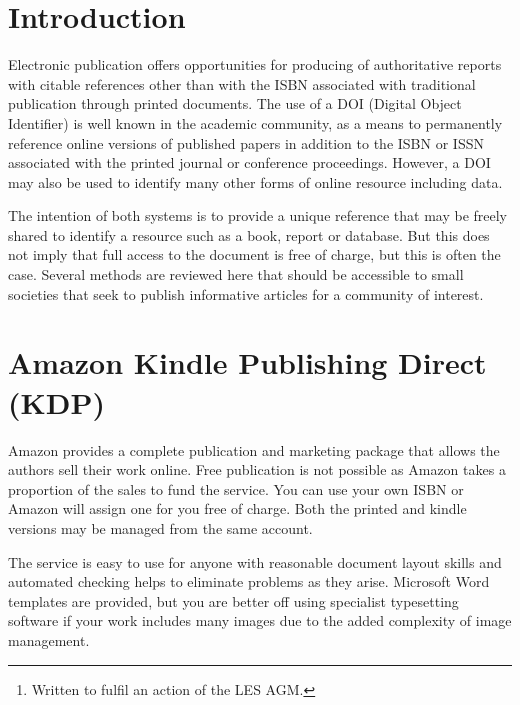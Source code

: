 \documentclass{article}
\title{\myTitleMainTitle}
\author{
    Dr Paul J. Palmer
    \thanks{Written to fulfil an action of the LES AGM.}
   \\
    Leicestershire Entomological Society \\
  \texttt{\href{mailto:palmerpjp@gmail.com}{\nolinkurl{palmerpjp@gmail.com}}} 
}
\begin{document}
\maketitle


\begin{abstract}
\myAbstract
\end{abstract}


\hypertarget{introduction}{%
\section{Introduction}\label{introduction}}

Electronic publication offers opportunities for producing of authoritative reports with citable references other than with the ISBN associated with traditional publication through printed documents. The use of a DOI (Digital Object Identifier) is well known in the academic community, as a means to permanently reference online versions of published papers in addition to the ISBN or ISSN associated with the printed journal or conference proceedings. However, a DOI may also be used to identify many other forms of online resource including data.

The intention of both systems is to provide a unique reference that may be freely shared to identify a resource such as a book, report or database. But this does not imply that full access to the document is free of charge, but this is often the case.  Several methods are reviewed here that should be accessible to small societies that seek to publish informative articles for a community of interest.

\section{Amazon Kindle Publishing Direct (KDP)}

Amazon provides a complete publication and marketing package that allows the authors sell their work online. Free publication is not possible as Amazon takes a proportion of the sales to fund the service. You can use your own ISBN or Amazon will assign one for you free of charge. Both the printed and kindle versions may be managed from the same account.

The service is easy to use for anyone with reasonable document layout skills and automated checking helps to eliminate problems as they arise. Microsoft Word templates are provided, but you are better off using specialist typesetting software if your work includes many images due to the added complexity of image management.
\end{document}
